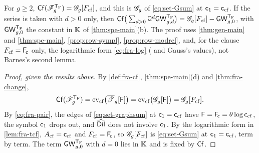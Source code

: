 \begin{prop}
\label{prop:fra-frame}
For $g\geq2$, $\mathsf{Cf}(\mathscr{F}_g^{\mathsf{T}_{\mathrm{F}}})=\mathscr{G}_g[F_{\mathrm{cf}}]$, and this is $\mathscr{G}_g$ of \eqref{eq:set-Gsum} at $\mathsf{c}_{1}=\mathsf{c}_{\mathrm{cf}}$. If the series is taken with $d>0$ only, then $\mathsf{Cf}\big(\sum_{d>0}\mathcal{Q}^d\mathsf{GW}_{g,d}^{\mathsf{T}_{\mathrm{F}}}\big)=\mathscr{G}_g[F_{\mathrm{cf}}]-\mathsf{GW}_{g,0}^{\mathsf{T}_{\mathrm{F}}}$, with $\mathsf{GW}_{g,0}^{\mathsf{T}_{\mathrm{F}}}$ the constant in $\mathbb{K}$ of \cref{thm:spe-main}\textup{(b)}. The proof uses \cref{thm:gen-main} and \cref{thm:spe-main}, \cref{prop:row-sympl}, \cref{prop:row-modrel}, \cite[Definitions~2.2, 2.5, 2.13 and Proposition~2.14]{PPZ15} and, for the clause $F_{\mathrm{cf}}=\mathsf{F}_{\!\mathsf{c}}$ only, the logarithmic form \eqref{eq:fra-log} (\cite[Eq.~15.6.7]{DLMF} and Gauss's values), not Barnes's second lemma.
\end{prop}

\begin{proof}[Proof, given the results above]
By \cref{def:fra-cf}, \cref{thm:spe-main}\textup{(d)} and \cref{thm:fra-change},
\[
\mathsf{Cf}(\mathscr{F}_g^{\mathsf{T}_{\mathrm{F}}})=\mathrm{ev}_{\mathrm{cf}}\big(\overline{\mathscr{T}}_g[\mathsf{F}]\big)=\mathrm{ev}_{\mathrm{cf}}\big(\mathscr{G}_g[\mathsf{F}]\big)=\mathscr{G}_g[F_{\mathrm{cf}}].
\]
By \eqref{eq:fra-pair}, the edges of \eqref{eq:set-graphsum} at $\mathsf{c}_{1}=\mathsf{c}_{\mathrm{cf}}$ have $\mathsf{F}=\mathsf{F}_{\!\mathsf{c}}=\theta\log\mathsf{c}_{\mathrm{cf}}$, the symbol $\mathsf{c}_{1}$ drops out, and $\widehat{\mathsf{Dil}}$ does not involve $\mathsf{c}_{1}$. By the logarithmic form in \cref{lem:fra-tcf}, $A_{\mathrm{cf}}=\mathsf{c}_{\mathrm{cf}}$ and $F_{\mathrm{cf}}=\mathsf{F}_{\!\mathsf{c}}$, so $\mathscr{G}_g[F_{\mathrm{cf}}]$ is \eqref{eq:set-Gsum} at $\mathsf{c}_{1}=\mathsf{c}_{\mathrm{cf}}$, term by term. The term $\mathsf{GW}_{g,0}^{\mathsf{T}_{\mathrm{F}}}$ with $d=0$ lies in $\mathbb{K}$ and is fixed by $\mathsf{Cf}$.
\end{proof}
